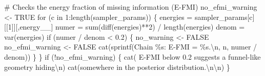 \documentclass[
  letterpaper,
  DIV=11,
  numbers=noendperiod]{scrartcl}
\newenvironment{Shaded}{\begin{snugshade}}{\end{snugshade}}
\newcommand{\CommentTok}[1]{\textcolor[rgb]{0.37,0.37,0.37}{#1}}
\newcommand{\ConstantTok}[1]{\textcolor[rgb]{0.56,0.35,0.01}{#1}}
\newcommand{\ControlFlowTok}[1]{\textcolor[rgb]{0.00,0.23,0.31}{#1}}
\newcommand{\DecValTok}[1]{\textcolor[rgb]{0.68,0.00,0.00}{#1}}
\newcommand{\FloatTok}[1]{\textcolor[rgb]{0.68,0.00,0.00}{#1}}
\newcommand{\FunctionTok}[1]{\textcolor[rgb]{0.28,0.35,0.67}{#1}}
\newcommand{\NormalTok}[1]{\textcolor[rgb]{0.00,0.23,0.31}{#1}}
\newcommand{\OtherTok}[1]{\textcolor[rgb]{0.00,0.23,0.31}{#1}}
\newcommand{\SpecialCharTok}[1]{\textcolor[rgb]{0.37,0.37,0.37}{#1}}
\newcommand{\StringTok}[1]{\textcolor[rgb]{0.13,0.47,0.30}{#1}}
\begin{document}
\begin{Shaded}
\begin{Highlighting}[]
  \CommentTok{\# Checks the energy fraction of missing information (E{-}FMI)}
\NormalTok{  no\_efmi\_warning }\OtherTok{\textless{}{-}} \ConstantTok{TRUE}
  \ControlFlowTok{for}\NormalTok{ (c }\ControlFlowTok{in} \DecValTok{1}\SpecialCharTok{:}\FunctionTok{length}\NormalTok{(sampler\_params)) \{}
\NormalTok{    energies }\OtherTok{=}\NormalTok{ sampler\_params[c][[}\DecValTok{1}\NormalTok{]][,}\StringTok{\textquotesingle{}energy\_\_\textquotesingle{}}\NormalTok{]}
\NormalTok{    numer }\OtherTok{=} \FunctionTok{sum}\NormalTok{(}\FunctionTok{diff}\NormalTok{(energies)}\SpecialCharTok{**}\DecValTok{2}\NormalTok{) }\SpecialCharTok{/} \FunctionTok{length}\NormalTok{(energies)}
\NormalTok{    denom }\OtherTok{=} \FunctionTok{var}\NormalTok{(energies)}
    \ControlFlowTok{if}\NormalTok{ (numer }\SpecialCharTok{/}\NormalTok{ denom }\SpecialCharTok{\textless{}} \FloatTok{0.2}\NormalTok{) \{}
\NormalTok{      no\_warning }\OtherTok{\textless{}{-}} \ConstantTok{FALSE}
\NormalTok{      no\_efmi\_warning }\OtherTok{\textless{}{-}} \ConstantTok{FALSE}
      \FunctionTok{cat}\NormalTok{(}\FunctionTok{sprintf}\NormalTok{(}\StringTok{\textquotesingle{}Chain \%s: E{-}FMI = \%s.}\SpecialCharTok{\textbackslash{}n}\StringTok{\textquotesingle{}}\NormalTok{, n, numer }\SpecialCharTok{/}\NormalTok{ denom))}
\NormalTok{    \}}
\NormalTok{  \}}
  \ControlFlowTok{if}\NormalTok{ (}\SpecialCharTok{!}\NormalTok{no\_efmi\_warning) \{}
    \FunctionTok{cat}\NormalTok{(}\StringTok{\textquotesingle{}  E{-}FMI below 0.2 suggests a funnel{-}like geometry hiding}\SpecialCharTok{\textbackslash{}n}\StringTok{\textquotesingle{}}\NormalTok{)}
    \FunctionTok{cat}\NormalTok{(}\StringTok{\textquotesingle{}somewhere in the posterior distribution.}\SpecialCharTok{\textbackslash{}n\textbackslash{}n}\StringTok{\textquotesingle{}}\NormalTok{)}
\NormalTok{  \}}


\end{Highlighting}
\end{Shaded}
\end{document}

